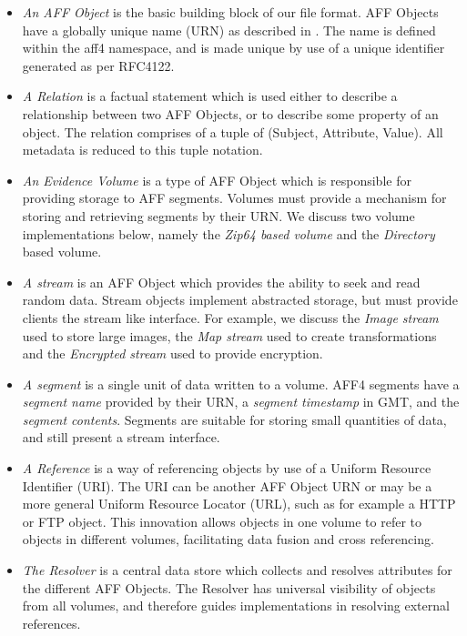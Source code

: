 \documentclass[10pt, conference]{IEEEtran}
\begin{document}
\begin{itemize}
\item \emph{An AFF Object} is the basic building block of our
  file format. AFF Objects have a globally unique name (URN) as
  described in \cite{RFC1737}. The name is defined within the aff4
  namespace, and is made unique by use of a unique identifier
  generated as per RFC4122\cite{RFC4122}.

\item \emph{A Relation} is a factual statement which is used either to describe
  a relationship between two AFF Objects, or to describe some property of an object. The relation comprises of a
  tuple of (Subject, Attribute, Value). All metadata is reduced to
  this tuple notation.

\item \emph{An Evidence Volume} is a type of AFF Object which is
responsible for providing storage to AFF segments. Volumes must
provide a mechanism for storing and retrieving segments by their
URN. We discuss two volume implementations below, namely the {\em
Zip64 based volume} and the {\em Directory} based volume.

\label{definitions}
\item \emph{A stream} is an AFF Object which provides the ability to
  seek and read random data. Stream objects implement abstracted
  storage, but must provide clients the stream like interface. For
  example, we discuss the {\em Image stream} used to store large
  images, the {\em Map stream} used to create transformations and the
  {\em Encrypted stream} used to provide encryption.

\item \emph{A segment} is a single unit of data written to a volume. AFF4
  segments have a \emph{segment name} provided by their URN, a
  \emph{segment timestamp} in GMT, and the \emph{segment
  contents}. Segments are suitable for storing small quantities of
  data, and still present a stream interface.

\item \emph{A Reference} is a way of referencing objects by use
  of a Uniform Resource Identifier (URI). The URI can be another AFF
  Object URN or may be a more general Uniform Resource Locator (URL),
  such as for example a HTTP or FTP object. This innovation allows
  objects in one volume to refer to objects in different volumes,
  facilitating data fusion and cross referencing.

\item \emph{The Resolver} is a central data store which collects and resolves
  attributes for the different AFF Objects. The Resolver has universal
  visibility of objects from all volumes, and therefore guides
  implementations in resolving external references.
\end{itemize}
\end{document}
